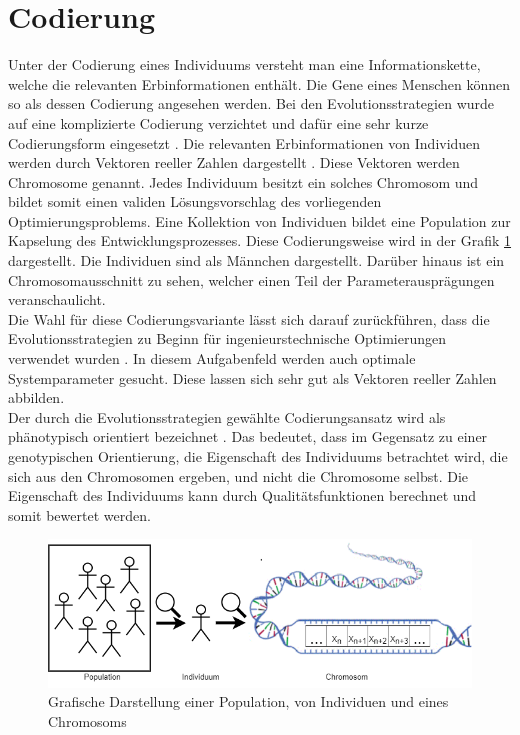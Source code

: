 \section{Codierung}
Unter der Codierung eines Individuums versteht man eine Informationskette, welche die relevanten Erbinformationen enthält.
Die Gene eines Menschen können so als dessen Codierung angesehen werden.
Bei den Evolutionsstrategien wurde auf eine komplizierte Codierung verzichtet und dafür eine sehr kurze Codierungsform eingesetzt \cite[S.147]{schoeneburg}. Die relevanten Erbinformationen von Individuen werden durch Vektoren reeller Zahlen dargestellt \cite[S.147]{schoeneburg}. Diese Vektoren werden Chromosome genannt. Jedes Individuum besitzt ein solches Chromosom und bildet somit einen validen Lösungsvorschlag des vorliegenden Optimierungsproblems.
Eine Kollektion von Individuen bildet eine Population zur Kapselung des Entwicklungsprozesses. Diese Codierungsweise wird in der Grafik \ref{fig:codierung} dargestellt. Die Individuen sind als Männchen dargestellt. Darüber hinaus ist ein Chromosomausschnitt zu sehen, welcher einen Teil der Parameterausprägungen veranschaulicht.\\
Die Wahl für diese Codierungsvariante lässt sich darauf zurückführen, dass die Evolutionsstrategien zu Beginn für ingenieurstechnische Optimierungen verwendet wurden \cite[S.147]{schoeneburg}.
In diesem Aufgabenfeld werden auch optimale Systemparameter gesucht. Diese lassen sich sehr gut als Vektoren reeller Zahlen abbilden.\\
Der durch die Evolutionsstrategien gewählte Codierungsansatz wird als phänotypisch orientiert bezeichnet \cite[S.148]{schoeneburg}. Das bedeutet, dass im Gegensatz zu einer genotypischen Orientierung, die Eigenschaft des Individuums betrachtet wird, die sich aus den Chromosomen ergeben, und nicht die Chromosome selbst.
Die Eigenschaft des Individuums kann durch Qualitätsfunktionen berechnet und somit bewertet werden.

\begin{figure}[!htb]
	\centering
	\includegraphics[width=1.\textwidth]{img/codierung/codierung.png}
	\caption{Grafische Darstellung einer Population, von Individuen und eines Chromosoms}
\label{fig:codierung}
\end{figure}
